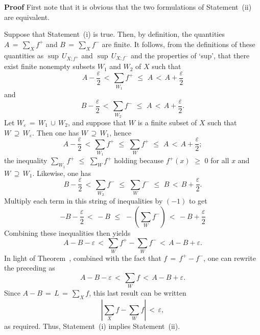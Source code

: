 \V

        {\bf Proof} First note that it is obvious that the two formulations of Statement~(ii) are equivalent.

\V

        Suppose that Statement~(i) is true. Then, by definition, the quantities $A \,=\, {\sum}_{X} f^{+}$ and $B \,=\, {\sum}_{X} f^{-}$ are finite.
    It follows, from the definitions of these quantities as ${\sup}\,U_{X;f^{+}}$ and ${\sup}\,U_{X;f^{-}}$ and the properties of `sup',
    that there exist finite nonempty subsets $W_{1}$ and $W_{2}$ of $X$ such that
        \begin{displaymath}
        A-\frac{{\varepsilon}}{2}\,<\,{\sum}_{W_{1}} f^{+}\,\,{\leq}\,\,A\,<\,A+\frac{{\varepsilon}}{2}
        \end{displaymath}
    and
        \begin{displaymath}
        B-\frac{{\varepsilon}}{2}\,<\,{\sum}_{W_{2}} f^{-}\,\,{\leq}\,\,A\,<\,A+\frac{{\varepsilon}}{2}.
        \end{displaymath}
    Let $W_{{\varepsilon}} \,=\, W_{1}\,{\cup}\,W_{2}$, and suppose that $W$ is a finite subset of $X$ such that $W \,{\supseteq}\, W_{{\varepsilon}}$.
    Then one has $W \,{\supseteq}\, W_{1}$, hence
        \begin{displaymath}
        A-\frac{{\varepsilon}}{2}\,<\,{\sum}_{W_{1}} f^{+} \,\,{\leq}\,\,{\sum}_{W} f^{+}\,\,{\leq}\,\,A\,<\,A+\frac{{\varepsilon}}{2};
        \end{displaymath}
    the inequality ${\sum}_{W_{1}} f^{+}\,\,{\leq}\,\,{\sum}_{W} f^{+}$ holding because $f^{+}(x)\,\,{\geq}\,\,0$ for all $x$ and $W \,{\supseteq}\, W_{1}$.
    Likewise, one has
        \begin{displaymath}
        B-\frac{{\varepsilon}}{2}\,<\,{\sum}_{W_{2}} f^{-}\,\,{\leq}\,\,{\sum}_{W} f^{-}\,\,{\leq}\,\,B\,<\,B+\frac{{\varepsilon}}{2}.
        \end{displaymath}
    Multiply each term in this string of inequalities by $(-1)$ to get
        \begin{displaymath}
        -B-\frac{{\varepsilon}}{2}\,<\,-B\,\,{\leq}\,\,-\left({\sum}_{W} f^{-}\right)\,<\,-B+\frac{{\varepsilon}}{2}
        \end{displaymath}
    Combining these inequalities then yields
        \begin{displaymath}
        A-B-{\varepsilon}\,<\,{\sum}_{W} f^{+} - {\sum}_{W} f^{-}\,<\,A-B + {\varepsilon}.
        \end{displaymath}
    In light of Theorem~, combined with the fact that $f \,=\, f^{+} - f^{-}$, one can rewrite the preceding as
        \begin{displaymath}
        A-B-{\varepsilon}\,<\,{\sum}_{W} f\,<\,A-B+{\varepsilon}.
        \end{displaymath}
    Since $A-B \,=\, L \,=\, {\sum}_{X} f$, this last result can be written
        \begin{displaymath}
        \left|{\sum}_{X} f - {\sum}_{W} f\right|\,<\,{\varepsilon},
        \end{displaymath}
    as required.
    Thus, Statement~(i) implies Statement~(ii).

